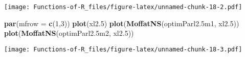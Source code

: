 \documentclass[
]{article}
\newenvironment{Shaded}{\begin{snugshade}}{\end{snugshade}}
\newcommand{\AttributeTok}[1]{\textcolor[rgb]{0.13,0.29,0.53}{#1}}
\newcommand{\DecValTok}[1]{\textcolor[rgb]{0.00,0.00,0.81}{#1}}
\newcommand{\FloatTok}[1]{\textcolor[rgb]{0.00,0.00,0.81}{#1}}
\newcommand{\FunctionTok}[1]{\textcolor[rgb]{0.13,0.29,0.53}{\textbf{#1}}}
\newcommand{\NormalTok}[1]{#1}
\begin{document}
\texttt{[image: Functions-of-R\_files/figure-latex/unnamed-chunk-18-2.pdf]}

\begin{Shaded}
\begin{Highlighting}[]
\FunctionTok{par}\NormalTok{(}\AttributeTok{mfrow =} \FunctionTok{c}\NormalTok{(}\DecValTok{1}\NormalTok{,}\DecValTok{3}\NormalTok{))}
\FunctionTok{plot}\NormalTok{(xl2}\FloatTok{.5}\NormalTok{)}
\FunctionTok{plot}\NormalTok{(}\FunctionTok{MoffatNS}\NormalTok{(optimParl2}\FloatTok{.5}\NormalTok{m1, xl2}\FloatTok{.5}\NormalTok{))}
\FunctionTok{plot}\NormalTok{(}\FunctionTok{MoffatNS}\NormalTok{(optimParl2}\FloatTok{.5}\NormalTok{m2, xl2}\FloatTok{.5}\NormalTok{))}
\end{Highlighting}
\end{Shaded}

\texttt{[image: Functions-of-R\_files/figure-latex/unnamed-chunk-18-3.pdf]}
\end{document}
